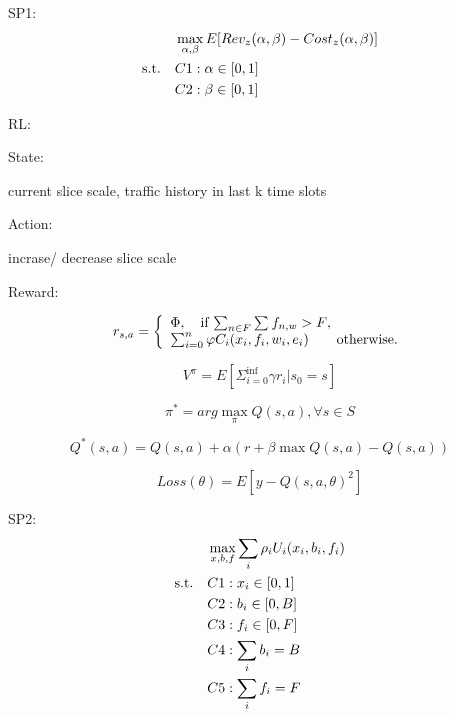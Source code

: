 \documentclass{article}
\begin{document}
SP1:
\begin{align}\
& \max_{\alpha, \beta} E[ Rev_{z}(\alpha, \beta) - Cost_{z}(\alpha, \beta) ] \nonumber\\
\rm{s.t.} \quad &C1: \alpha \in [0,1] \nonumber\\ 
\quad &C2: \beta \in [0,1] \nonumber\\
\end{align}

RL:

State:

current slice scale, traffic history in last k time slots

Action:

incrase/ decrease slice scale

Reward:

\begin{equation}
r_{s,a} = \left\{
	\begin{array}{ll}   
	\Phi, \quad \mbox{if $ \sum_{n \in F} \sum_{} f_{n,w} > F$}, \\
    \sum_{i=0}^{n} \varphi C_{i} (x_{i}, f_{i}, w_{i}, e_{i}) \qquad \mbox{otherwise.}
	\end{array}
\right.
\end{equation}

\begin{equation}
V^{\pi}=E[ \Sigma_{i=0}^{\inf} \gamma r_{i} \vert s_{0}=s ]
\end{equation}

\begin{equation}
\pi^{*}=arg \max_{\pi}  Q(s,a), \forall s \in S
\end{equation}

\begin{equation}
Q^{*}(s,a)=Q(s,a)+\alpha( r + \beta \max Q(s,a) - Q(s,a))
\end{equation}

\begin{equation}
Loss(\theta)=E[ y - Q(s,a,\theta)^{2}]
\end{equation}

SP2:
\begin{align}\
& \max_{x,b,f} \sum_{i}\rho_{i}U_{i}(x_{i},b_{i},f_{i})  \nonumber\\
\rm{s.t.} \quad &C1: x_{i} \in [0,1] \nonumber\\ 
\quad &C2: b_{i} \in [0,B] \nonumber\\
\quad &C3: f_{i} \in [0,F] \nonumber\\
\quad &C4: \sum_{i}b_{i}=B \nonumber\\
\quad &C5: \sum_{i}f_{i}=F \nonumber\\
\end{align}
\end{document}
